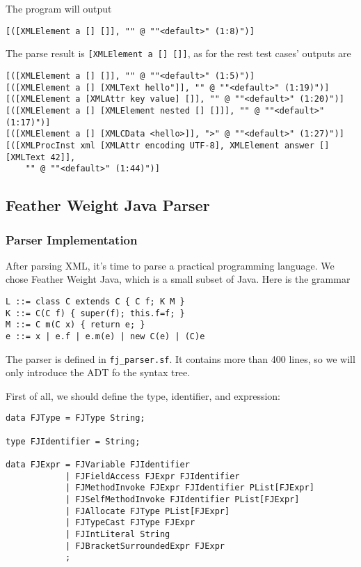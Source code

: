 The program will output

\begin{lstlisting}
[([XMLElement a [] []], "" @ ""<default>" (1:8)")]
\end{lstlisting}

The parse result is \texttt{[XMLElement a [] []]}, as for the rest test cases' outputs are

\begin{lstlisting}
[([XMLElement a [] []], "" @ ""<default>" (1:5)")]
[([XMLElement a [] [XMLText hello"]], "" @ ""<default>" (1:19)")]
[([XMLElement a [XMLAttr key value] []], "" @ ""<default>" (1:20)")]
[([XMLElement a [] [XMLElement nested [] []]], "" @ ""<default>" (1:17)")]
[([XMLElement a [] [XMLCData <hello>]], ">" @ ""<default>" (1:27)")]
[([XMLProcInst xml [XMLAttr encoding UTF-8], XMLElement answer [] [XMLText 42]],
    "" @ ""<default>" (1:44)")]
\end{lstlisting}

\subsection{Feather Weight Java Parser}

\subsubsection{Parser Implementation}

After parsing XML, it's time to parse a practical programming language. We chose Feather Weight Java, which is a small subset of Java. Here is the grammar

\begin{lstlisting}[language={}]
L ::= class C extends C { C f; K M }
K ::= C(C f) { super(f); this.f=f; }
M ::= C m(C x) { return e; }
e ::= x | e.f | e.m(e) | new C(e) | (C)e
\end{lstlisting}

The parser is defined in \texttt{fj\_parser.sf}. It contains more than 400 lines, so we will only introduce the ADT fo the syntax tree.

First of all, we should define the type, identifier, and expression:

\begin{lstlisting}
data FJType = FJType String;

type FJIdentifier = String;

data FJExpr = FJVariable FJIdentifier
            | FJFieldAccess FJExpr FJIdentifier
            | FJMethodInvoke FJExpr FJIdentifier PList[FJExpr]
            | FJSelfMethodInvoke FJIdentifier PList[FJExpr]
            | FJAllocate FJType PList[FJExpr]
            | FJTypeCast FJType FJExpr
            | FJIntLiteral String
            | FJBracketSurroundedExpr FJExpr
            ;
\end{lstlisting}

